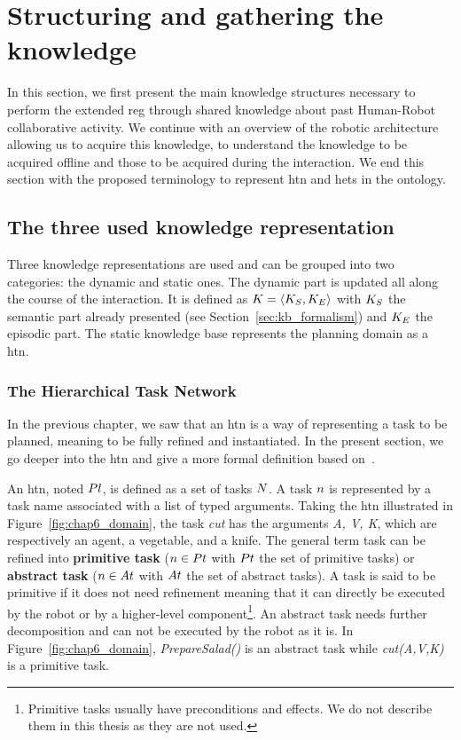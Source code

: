 \section{Structuring and gathering the knowledge}

In this section, we first present the main knowledge structures necessary to perform the extended \acrshort{reg} through shared knowledge about past Human-Robot collaborative activity. We continue with an overview of the robotic architecture allowing us to acquire this knowledge, to understand the knowledge to be acquired offline and those to be acquired during the interaction. We end this section with the proposed terminology to represent \acrshort{htn} and \acrshort{het}s in the ontology.

\subsection{The three used knowledge representation}

Three knowledge representations are used and can be grouped into two categories: the dynamic and static ones. The dynamic part is updated all along the course of the interaction. It is defined as $K = \langle K_S, K_E \rangle$ with $K_S$ the semantic part already presented (see Section~\ref{sec:kb_formalism}) and $K_E$ the episodic part. The static knowledge base represents the planning domain as a \acrfull{htn}.

\subsubsection{The Hierarchical Task Network}

In the previous chapter, we saw that an \acrshort{htn} is a way of representing a task to be planned, meaning to be fully refined and instantiated. In the present section, we go deeper into the \acrshort{htn} and give a more formal definition based on~\cite{erol_1994_htn}.

An \acrshort{htn}, noted $Pl$, is defined as a set of tasks $N$. A task $n$ is represented by a task name associated with a list of typed arguments. Taking the \acrshort{htn} illustrated in Figure~\ref{fig:chap6_domain}, the task \textit{cut} has the arguments \textit{A, V, K}, which are respectively an agent, a vegetable, and a knife. The general term task can be refined into \textbf{primitive task} ($n \in Pt$ with $Pt$ the set of primitive tasks) or \textbf{abstract task} ($n \in At$ with $At$ the set of abstract tasks). A task is said to be primitive if it does not need refinement meaning that it can directly be executed by the robot or by a higher-level component\footnote{Primitive tasks usually have preconditions and effects. We do not describe them in this thesis as they are not used.}. An abstract task needs further decomposition and can not be executed by the robot as it is. In Figure~\ref{fig:chap6_domain}, \textit{PrepareSalad()} is an abstract task while \textit{cut(A,V,K)} is a primitive task.

